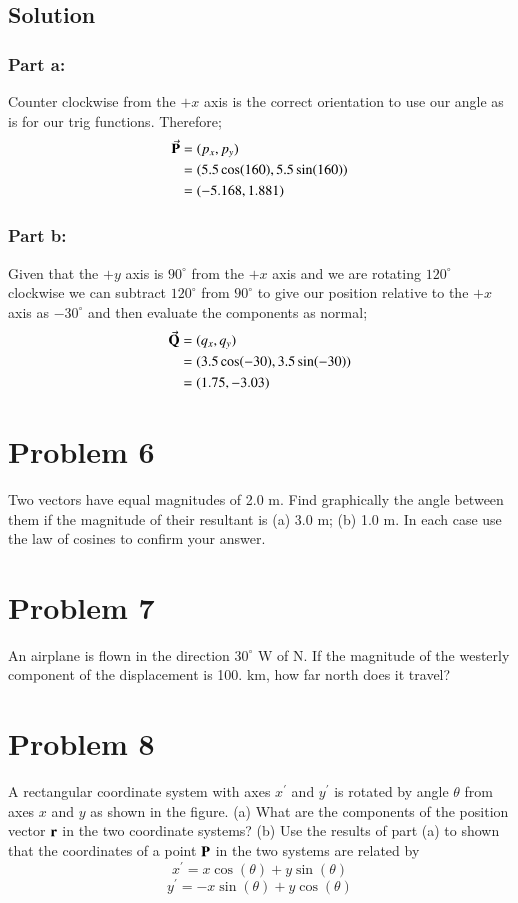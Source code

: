 \documentclass{article}
\begin{document}
\subsection*{Solution}
\subsubsection*{Part a:}
Counter clockwise from the $+x$ axis is the correct orientation to use our angle as is for our trig functions. Therefore;
\begin{align*}
	\va P &= (p_x,p_y)\\
	&= (5.5\cos(160),5.5\sin(160)) \\
	&= (-5.168,1.881)
\end{align*}

\subsubsection*{Part b:}
Given that the $+y$ axis is $90^\circ$ from the $+x$ axis and we are rotating $120^\circ$ clockwise we can subtract $120^\circ$ from $90^\circ$ to give our position relative to the $+x$ axis as $-30^\circ$ and then evaluate the components as normal;
\begin{align*}
	\va Q &= (q_x,q_y)\\
	&= (3.5\cos(-30),3.5\sin(-30)) \\
	&= (1.75,-3.03)
\end{align*}

\section*{Problem 6}
Two vectors have equal magnitudes of 2.0 m. Find graphically the angle between them if the
magnitude of their resultant is (a) 3.0 m; (b) 1.0 m. In each case use the law of cosines to confirm
your answer.

\section*{Problem 7}
An airplane is flown in the direction $30^\circ$ W of N. If the magnitude of the westerly component
of the displacement is 100. km, how far north does it travel?

\section*{Problem 8}
A rectangular coordinate system with axes $x^\prime$ and $y^\prime$ is rotated by angle $\theta$ from axes $x$ and $y$
as shown in the figure. (a) What are the components of the position vector $\vb r$ in the two
coordinate systems? (b) Use the results of part (a) to shown that the coordinates of a point $\vb P$ in
the two systems are related by
\[
	x^\prime = x\cos(\theta) + y\sin(\theta)
\]
\[
	y^\prime = -x\sin(\theta) + y\cos(\theta)
\]
\end{document}
